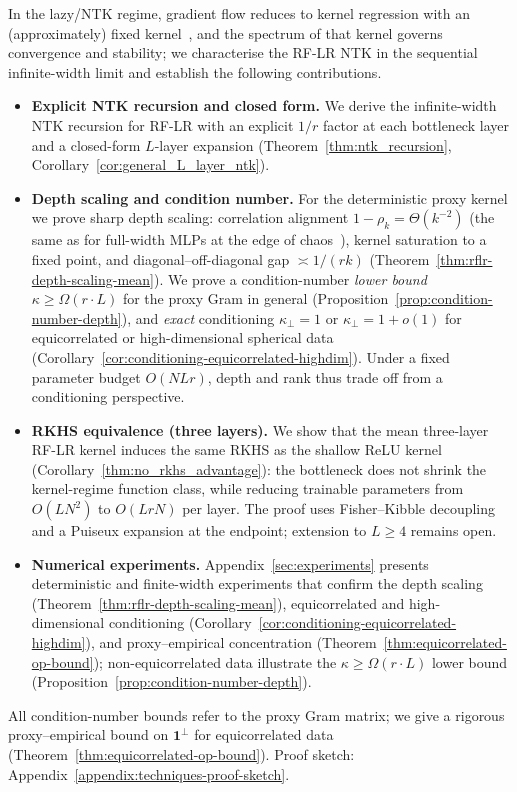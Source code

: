 In the lazy/NTK regime, gradient flow reduces to kernel regression with an (approximately) fixed kernel~\cite{jacot2018neural}, and the spectrum of that kernel governs convergence and stability; we characterise the RF-LR NTK in the sequential infinite-width limit and establish the following contributions.
\begin{itemize}
    \item \textbf{Explicit NTK recursion and closed form.} We derive the infinite-width NTK recursion for RF-LR with an explicit \(1/r\) factor at each bottleneck layer and a closed-form \(L\)-layer expansion (Theorem~\ref{thm:ntk_recursion}, Corollary~\ref{cor:general_L_layer_ntk}).
    \item \textbf{Depth scaling and condition number.} For the deterministic proxy kernel we prove sharp depth scaling: correlation alignment \(1-\rho_k=\Theta(k^{-2})\) (the same as for full-width MLPs at the edge of chaos~\cite{terjek2025mlpsateoc,pmlr-v163-hayou22a}), kernel saturation to a fixed point, and diagonal--off-diagonal gap \(\asymp 1/(rk)\) (Theorem~\ref{thm:rflr-depth-scaling-mean}). We prove a condition-number \emph{lower bound} \(\kappa\ge\Omega(r\cdot L)\) for the proxy Gram in general (Proposition~\ref{prop:condition-number-depth}), and \emph{exact} conditioning \(\kappa_\perp=1\) or \(\kappa_\perp=1+o(1)\) for equicorrelated or high-dimensional spherical data (Corollary~\ref{cor:conditioning-equicorrelated-highdim}). Under a fixed parameter budget \(O(NLr)\), depth and rank thus trade off from a conditioning perspective.
    \item \textbf{RKHS equivalence (three layers).} We show that the mean three-layer RF-LR kernel induces the same RKHS as the shallow ReLU kernel (Corollary~\ref{thm:no_rkhs_advantage}): the bottleneck does not shrink the kernel-regime function class, while reducing trainable parameters from \(O(LN^2)\) to \(O(LrN)\) per layer. The proof uses Fisher--Kibble decoupling and a Puiseux expansion at the endpoint; extension to \(L\ge 4\) remains open.
    \item \textbf{Numerical experiments.} Appendix~\ref{sec:experiments} presents deterministic and finite-width experiments that confirm the depth scaling (Theorem~\ref{thm:rflr-depth-scaling-mean}), equicorrelated and high-dimensional conditioning (Corollary~\ref{cor:conditioning-equicorrelated-highdim}), and proxy--empirical concentration (Theorem~\ref{thm:equicorrelated-op-bound}); non-equicorrelated data illustrate the \(\kappa\ge\Omega(r\cdot L)\) lower bound (Proposition~\ref{prop:condition-number-depth}).
\end{itemize}
All condition-number bounds refer to the proxy Gram matrix; we give a rigorous proxy--empirical bound on \(\mathbf{1}^\perp\) for equicorrelated data (Theorem~\ref{thm:equicorrelated-op-bound}). Proof sketch: Appendix~\ref{appendix:techniques-proof-sketch}.

